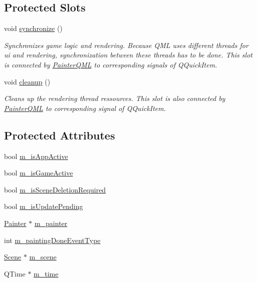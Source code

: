 \subsection*{Protected Slots}
\begin{DoxyCompactItemize}
\item 
void \hyperlink{class_painter_q_m_l_a4cfd22a52fc9e29d304c0ff7cea86744}{synchronize} ()
\begin{DoxyCompactList}\small\item\em Synchronizes game logic and rendering.  Because Q\+M\+L uses different threads for ui and rendering, synchronization between these threads has to be done. This slot is connected by \hyperlink{class_painter_q_m_l}{Painter\+Q\+M\+L} to corresponding signals of Q\+Quick\+Item. \end{DoxyCompactList}\item 
void \hyperlink{class_painter_q_m_l_ab07e4719d2b05bbbfa48980b4854d190}{cleanup} ()
\begin{DoxyCompactList}\small\item\em Cleans up the rendering thread ressources.  This slot is also connected by \hyperlink{class_painter_q_m_l}{Painter\+Q\+M\+L} to corresponding signal of Q\+Quick\+Item. \end{DoxyCompactList}\end{DoxyCompactItemize}
\subsection*{Protected Attributes}
\begin{DoxyCompactItemize}
\item 
bool \hyperlink{class_painter_q_m_l_a9acde8bb9dae70089141153efe168690}{m\+\_\+is\+App\+Active}
\item 
bool \hyperlink{class_painter_q_m_l_ab6aae1f8b8723eb4ebe7677ddc18ee11}{m\+\_\+is\+Game\+Active}
\item 
bool \hyperlink{class_painter_q_m_l_ae2e60015d5cc12a5fb5b5d0402189532}{m\+\_\+is\+Scene\+Deletion\+Required}
\item 
bool \hyperlink{class_painter_q_m_l_a3b291f7043ad8437baadf6d7be1c174d}{m\+\_\+is\+Update\+Pending}
\item 
\hyperlink{class_painter}{Painter} $\ast$ \hyperlink{class_painter_q_m_l_a6b21bae1a75260e121bc56cda38729c8}{m\+\_\+painter}
\item 
int \hyperlink{class_painter_q_m_l_a7a6641710573e4fa47dfdae13e87d58e}{m\+\_\+painting\+Done\+Event\+Type}
\item 
\hyperlink{class_scene}{Scene} $\ast$ \hyperlink{class_painter_q_m_l_a5eccac2ab6d9974a9ae94573ac7b19d6}{m\+\_\+scene}
\item 
Q\+Time $\ast$ \hyperlink{class_painter_q_m_l_ad4ced718f47b69f2344a5311ec87a156}{m\+\_\+time}
\end{DoxyCompactItemize}


